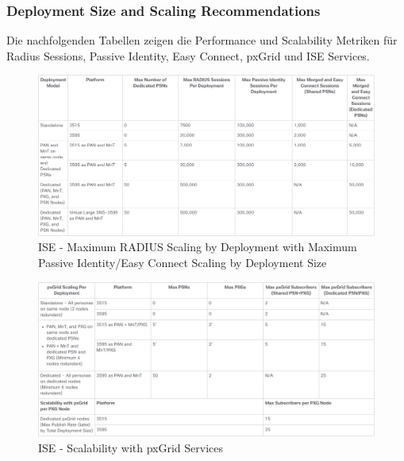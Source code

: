 \subsubsection{Deployment Size and Scaling Recommendations}

Die nachfolgenden Tabellen zeigen die Performance und Scalability Metriken für Radius Sessions, Passive Identity, Easy Connect, pxGrid und ISE Services.

\begin{figure}[H]
	\centering
	\includegraphics[width=1\linewidth]{img/Absicherung/ISE-MaxRadiusScaling}
	\caption{ISE - Maximum RADIUS Scaling by Deployment with Maximum Passive Identity/Easy Connect Scaling by Deployment Size \cite{ise-scale}}
	\label{fig:ISE - Maximum RADIUS Scaling}
\end{figure}

\begin{figure}[H]
	\centering
	\includegraphics[width=1\linewidth]{img/Absicherung/ISE-pxGridServicesScalability}
	\caption{ISE - Scalability with pxGrid Services \cite{ise-scale}}
	\label{fig:ISE - Scalability with pxGrid Service}
\end{figure}

